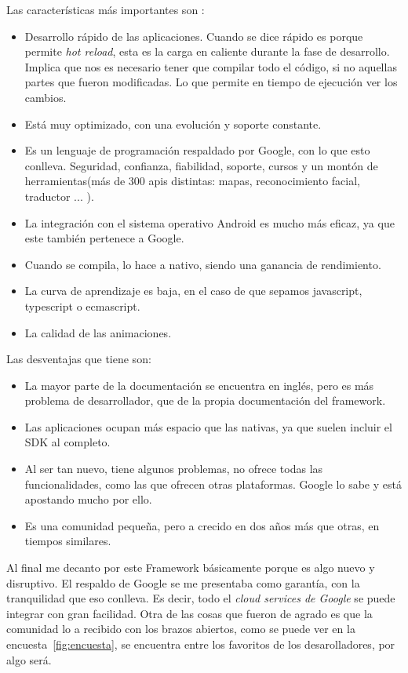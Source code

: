 Las características más importantes son : 

\begin{itemize}
	\item Desarrollo rápido de las aplicaciones. Cuando se dice rápido es porque permite \emph{hot reload}, esta es la carga en caliente durante la fase de desarrollo. Implica que nos es necesario tener que compilar todo el código, si no aquellas partes que fueron modificadas. Lo que permite en tiempo de ejecución ver los cambios.
	\item Está muy optimizado, con una evolución y soporte constante.
	\item Es un lenguaje de programación respaldado por Google, con lo que esto conlleva. Seguridad, confianza, fiabilidad, soporte, cursos y un montón de herramientas(más de 300 apis distintas: mapas, reconocimiento facial, traductor ... ).
	\item La integración con el sistema operativo Android es mucho más eficaz, ya que este también pertenece a Google.
	\item Cuando se compila, lo hace a nativo, siendo una ganancia de rendimiento.
	\item La curva de aprendizaje es baja, en el caso de que sepamos javascript, typescript o ecmascript.
	\item La calidad de las animaciones.
\end{itemize}

Las desventajas que tiene son:
\begin{itemize}
	\item La mayor parte de la documentación se encuentra en inglés, pero es más problema de desarrollador, que de la propia documentación del framework.
	\item Las aplicaciones ocupan más espacio que las nativas, ya que suelen incluir el SDK al completo.
	\item Al ser tan nuevo, tiene algunos problemas, no ofrece todas las funcionalidades, como las que ofrecen otras plataformas. Google lo sabe y está apostando mucho por ello.
	\item Es una comunidad pequeña, pero a crecido en dos años más que otras, en tiempos similares.
\end{itemize}

Al final me decanto por este Framework básicamente porque es algo nuevo y disruptivo. El respaldo de Google se me presentaba como garantía, con la tranquilidad que eso conlleva. Es decir, todo el \emph{cloud services de Google} se puede integrar con gran facilidad.
Otra de las cosas que fueron de agrado es que la comunidad lo a recibido con los brazos abiertos, como se puede ver en la encuesta~\ref{fig:encuesta}, se encuentra entre los favoritos de los desarolladores, por algo será.


